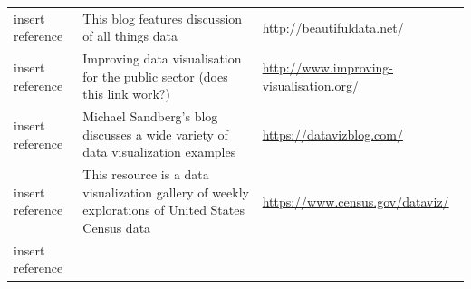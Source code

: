 \documentclass[]{book}
\begin{document}
\begin{longtable}[]{@{}lll@{}}
\begin{minipage}[t]{0.15\columnwidth}\raggedright\strut
insert reference\strut
\end{minipage} & \begin{minipage}[t]{0.28\columnwidth}\raggedright\strut
This blog features discussion of all things data\strut
\end{minipage} & \begin{minipage}[t]{0.48\columnwidth}\raggedright\strut
\url{http://beautifuldata.net/}\strut
\end{minipage}\tabularnewline
\begin{minipage}[t]{0.15\columnwidth}\raggedright\strut
insert reference\strut
\end{minipage} & \begin{minipage}[t]{0.28\columnwidth}\raggedright\strut
Improving data visualisation for the public sector (does this link
work?)\strut
\end{minipage} & \begin{minipage}[t]{0.48\columnwidth}\raggedright\strut
\url{http://www.improving-visualisation.org/}\strut
\end{minipage}\tabularnewline
\begin{minipage}[t]{0.15\columnwidth}\raggedright\strut
insert reference\strut
\end{minipage} & \begin{minipage}[t]{0.28\columnwidth}\raggedright\strut
Michael Sandberg's blog discusses a wide variety of data visualization
examples\strut
\end{minipage} & \begin{minipage}[t]{0.48\columnwidth}\raggedright\strut
\url{https://datavizblog.com/}\strut
\end{minipage}\tabularnewline
\begin{minipage}[t]{0.15\columnwidth}\raggedright\strut
insert reference\strut
\end{minipage} & \begin{minipage}[t]{0.28\columnwidth}\raggedright\strut
This resource is a data visualization gallery of weekly explorations of
United States Census data\strut
\end{minipage} & \begin{minipage}[t]{0.48\columnwidth}\raggedright\strut
\url{https://www.census.gov/dataviz/}\strut
\end{minipage}\tabularnewline
\begin{minipage}[t]{0.15\columnwidth}\raggedright\strut
insert reference\strut
\end{minipage} & \begin{minipage}[t]{0.28\columnwidth}\raggedright\strut

\end{minipage}
\end{longtable}
\end{document}
